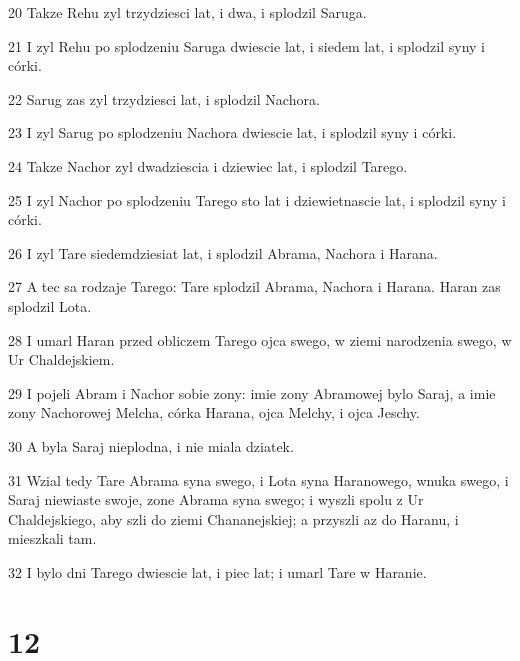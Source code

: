 \par 20 Takze Rehu zyl trzydziesci lat, i dwa, i splodzil Saruga.
\par 21 I zyl Rehu po splodzeniu Saruga dwiescie lat, i siedem lat, i splodzil syny i córki.
\par 22 Sarug zas zyl trzydziesci lat, i splodzil Nachora.
\par 23 I zyl Sarug po splodzeniu Nachora dwiescie lat, i splodzil syny i córki.
\par 24 Takze Nachor zyl dwadziescia i dziewiec lat, i splodzil Tarego.
\par 25 I zyl Nachor po splodzeniu Tarego sto lat i dziewietnascie lat, i splodzil syny i córki.
\par 26 I zyl Tare siedemdziesiat lat, i splodzil Abrama, Nachora i Harana.
\par 27 A tec sa rodzaje Tarego: Tare splodzil Abrama, Nachora i Harana. Haran zas splodzil Lota.
\par 28 I umarl Haran przed obliczem Tarego ojca swego, w ziemi narodzenia swego, w Ur Chaldejskiem.
\par 29 I pojeli Abram i Nachor sobie zony: imie zony Abramowej bylo Saraj, a imie zony Nachorowej Melcha, córka Harana, ojca Melchy, i ojca Jeschy.
\par 30 A byla Saraj nieplodna, i nie miala dziatek.
\par 31 Wzial tedy Tare Abrama syna swego, i Lota syna Haranowego, wnuka swego, i Saraj niewiaste swoje, zone Abrama syna swego; i wyszli spolu z Ur Chaldejskiego, aby szli do ziemi Chananejskiej; a przyszli az do Haranu, i mieszkali tam.
\par 32 I bylo dni Tarego dwiescie lat, i piec lat; i umarl Tare w Haranie.

\chapter{12}

